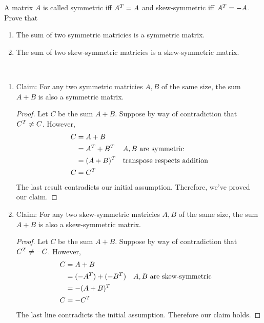 \documentclass{article}
\begin{document}
    \bigbreak
    \begin{problem}
        A matrix $A$ is called symmetric iff $A^T = A$ and skew-symmetric iff $A^T = -A$. Prove that
        \begin{enumerate}[label=(\alph*)]
            \item The sum of two symmetric matricies is a symmetric matrix. 
            \item The sum of two skew-symmetric matricies is a skew-symmetric matrix. 
        \end{enumerate}
    \end{problem}

    \begin{solution}
        ~%
        \begin{enumerate}[label=(\alph*)]
            \item Claim: For any two symmetric matricies $A, B$ of the same size, the sum $A + B$ is also a symmetric matrix.
            \begin{proof}
                Let $C$ be the sum $A + B$. 
                Suppose by way of contradiction that $C^T \neq C$.
                However,
                \begin{align*}
                    C &= A + B && \\
                      &= A^T + B^T && A, B \text{ are symmetric}\\
                      &= (A + B)^T && \text{transpose respects addition} \\
                    C &= C^T
                \end{align*}
                The last result contradicts our initial assumption. Therefore, we've proved our claim.
            \end{proof}

            \item Claim: For any two skew-symmetric matricies $A, B$ of the same size, the sum $A + B$ is also a skew-symmetric matrix.
            \begin{proof}
                Let $C$ be the sum $A + B$. 
                Suppose by way of contradiction that $C^T \neq -C$.
                However, 
                \begin{align*}
                    C &= A + B \\
                      &= (-A^T) + (-B^T) && A, B\text{ are skew-symmetric} \\
                      &= -(A + B)^T \\
                    C &= -C^T
                \end{align*}
                The last line contradicts the initial assumption. Therefore our claim holds.
            \end{proof}
        \end{enumerate}
    \end{solution}
\end{document}
